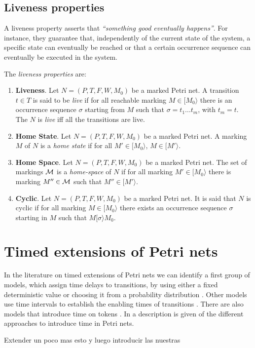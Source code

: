 
\subsection{Liveness properties}
A liveness property asserts that \emph{``something good eventually happens''}.
For instance, they guarantee that, independently of the current state of the system,
a specific state can eventually be reached or that a certain occurrence sequence can eventually
be executed in the system.

The \emph{liveness properties} are:
\begin{enumerate}
\item {\bf Liveness}.
Let $N=(P,T,F,W,M_0)$ be a marked Petri net. A transition $t \in T$
is said to be {\it live} if for all reachable marking $M \in
[ M_0 \rangle$ there is an occurrence sequence $\sigma$ starting from $M$ such that
$\sigma = t_1 \ldots t_m$, with $t_m = t$. The $N$ is {\it live} iff all the transitions are live.
\item {\bf Home State}.
Let $N=(P,T,F,W,M_0)$ be a marked Petri net. A marking $M$ of $N$ is a {\it home state} if for all
$M' \in [ M_0 \rangle$, $M \in [ M' \rangle$.
\item {\bf Home Space}. Let $N=(P,T,F,W,M_0)$ be a marked Petri net.
The set of markings ${\cal M}$ is a {\it home-space}
of $N$ if for all marking $M' \in [ M_0 \rangle$ there is marking
$M'' \in {\cal M}$ such that $M'' \in [ M' \rangle$.
\item {\bf Cyclic}.
Let $N=(P,T,F,W,M_0)$ be a marked Petri net. It is said that
$N$ is cyclic if for all marking $M \in [ M_0 \rangle$ there exists an occurrence sequence $\sigma$
starting in $M$ such that $M [ \sigma \rangle M_0$.
\end{enumerate}





\section{Timed extensions of Petri nets}

In the
literature on timed extensions of Petri nets we can identify a
first group of models, which assign time delays to transitions,
by using either a fixed deterministic value
\cite{Ram73,Sif77,VFC93} or choosing it from a probability
distribution \cite{AjCh85}. Other models use time intervals to
establish the enabling times of transitions \cite{Mer74}. 
There are also models that introduce time on tokens
\cite{van93,van95,BLT90}. In \cite{Bow96,Wan98} 
a description is given of the different approaches 
to introduce time in Petri nets.

Extender un poco mas esto y luego introducir las nuestras



